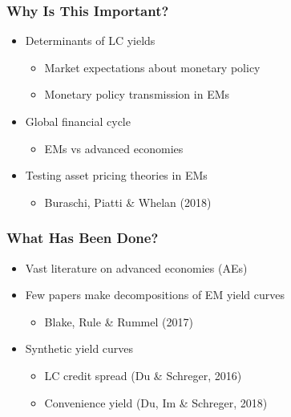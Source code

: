 \documentclass[12pt, xcolor=dvipsnames]{beamer} 			         %
\begin{document}
\begin{frame}
	\frametitle{Why Is This Important?}
	\begin{itemize}
		\item Determinants of LC yields
		\begin{itemize}
			\item Market expectations about monetary policy
			\item Monetary policy transmission in EMs
		\end{itemize}
		\item<2-> Global financial cycle
		\begin{itemize}
			\item<2-> EMs vs advanced economies
		\end{itemize}
		\item<3> Testing asset pricing theories in EMs
		\begin{itemize}
			\item<3> Buraschi, Piatti \& Whelan (2018)
		\end{itemize}
	\end{itemize}
\end{frame}

\begin{frame}
	\frametitle{What Has Been Done?}
	\begin{itemize}
		\item Vast literature on advanced economies (AEs)
		\item Few papers make decompositions of EM yield curves	
		\begin{itemize}
			\item Blake, Rule \& Rummel (2017)
		\end{itemize}
		\item<2-> Synthetic yield curves
		\begin{itemize}
			\item<2-> LC credit spread (Du \& Schreger, 2016)
			\item<2-> Convenience yield (Du, Im \& Schreger, 2018)
		\end{itemize}
	\end{itemize}
\end{frame}
\end{document}
